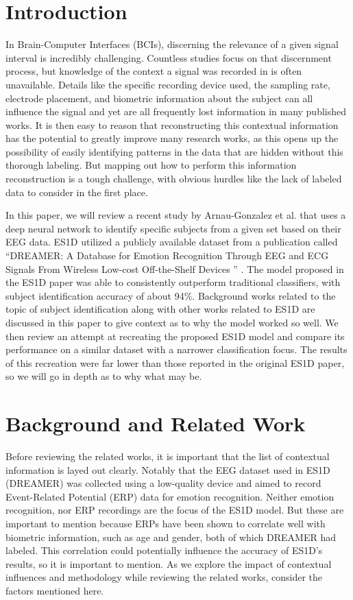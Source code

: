 
\newpage

\section{Introduction}
In Brain-Computer Interfaces (BCIs), discerning the relevance of a given signal interval is incredibly challenging.
Countless studies focus on that discernment process, but knowledge of the context a signal was recorded in is often unavailable.
Details like the specific recording device used, the sampling rate, electrode placement, and biometric information about the subject can all influence the signal and yet are all frequently lost information in many published works.\cite{Review}
It is then easy to reason that reconstructing this contextual information has the potential to greatly improve many research works, as this opens up the possibility of easily identifying patterns in the data that are hidden without this thorough labeling.
But mapping out how to perform this information reconstruction is a tough challenge, with obvious hurdles like the lack of labeled data to consider in the first place.

In this paper, we will review a recent study by Arnau-Gonzalez et al. \cite{ES1D} that uses a deep neural network to identify specific subjects from a given set based on their EEG data.
ES1D utilized a publicly available dataset from a publication called ``DREAMER: A Database for Emotion Recognition Through EEG and ECG Signals From Wireless Low-cost Off-the-Shelf Devices
'' \cite{DREAMER}. The model proposed in the ES1D paper was able to consistently outperform traditional classifiers, with subject identification accuracy of about 94\%\cite{ES1D}.
Background works related to the topic of subject identification along with other works related to ES1D are discussed in this paper to give context as to why the model worked so well.
We then review an attempt at recreating the proposed ES1D model and compare its performance on a similar dataset with a narrower classification focus.
The results of this recreation were far lower than those reported in the original ES1D paper, so we will go in depth as to why what may be.

\section{Background and Related Work}
Before reviewing the related works, it is important that the list of contextual information is layed out clearly.
Notably that the EEG dataset used in ES1D (DREAMER\cite{DREAMER}) was collected using a low-quality device and aimed to record Event-Related Potential (ERP) data for emotion recognition.
Neither emotion recognition, nor ERP recordings are the focus of the ES1D model. But these are important to mention because ERPs have been shown to correlate well with biometric information, such as age and gender, both of which DREAMER had labeled.
This correlation could potentially influence the accuracy of ES1D's results, so it is important to mention.
As we explore the impact of contextual influences and methodology while reviewing the related works, consider the factors mentioned here.
